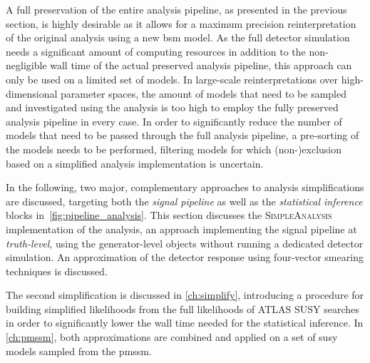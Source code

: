 A full preservation of the entire analysis pipeline, as presented in the previous section, is highly desirable as it allows for a maximum precision reinterpretation of the original analysis using a new \gls{bsm} model.
As the full detector simulation needs a significant amount of computing resources in addition to the non-negligible wall time of the actual preserved analysis pipeline, this approach can only be used on a limited set of models.
In large-scale reinterpretations over high-dimensional parameter spaces, the amount of models that need to be sampled and investigated using the analysis is too high to employ the fully preserved analysis pipeline in every case.
In order to significantly reduce the number of models that need to be passed through the full analysis pipeline, a pre-sorting of the models needs to be performed, filtering models for which (non-)exclusion based on a simplified analysis implementation is uncertain.

In the following, two major, complementary approaches to analysis simplifications are discussed, targeting both the \textit{signal pipeline} as well as the \textit{statistical inference} blocks in~\cref{fig:pipeline_analysis}.
This section discusses the \textsc{SimpleAnalysis} implementation of the analysis, an approach implementing the signal pipeline at \textit{truth-level}, \ie using the generator-level objects without running a dedicated detector simulation. An approximation of the detector response using four-vector smearing techniques is discussed.

The second simplification is discussed in \cref{ch:simplify}, introducing a procedure for building simplified likelihoods from the full likelihoods of ATLAS SUSY searches in order to significantly lower the wall time needed for the statistical inference. 
In \cref{ch:pmssm}, both approximations are combined and applied on a set of \gls{susy} models sampled from the \gls{pmssm}.


